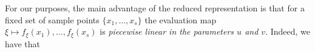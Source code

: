 For our purposes, the main advantage of the reduced representation is that for a fixed set of sample points $\{x_1,\ldots,x_s\}$ the evaluation map $\xi \mapsto f_\xi (x_1), \ldots, f_\xi(x_s)$ is \emph{piecewise linear in the parameters $u$ and $v$}. Indeed, we have that


